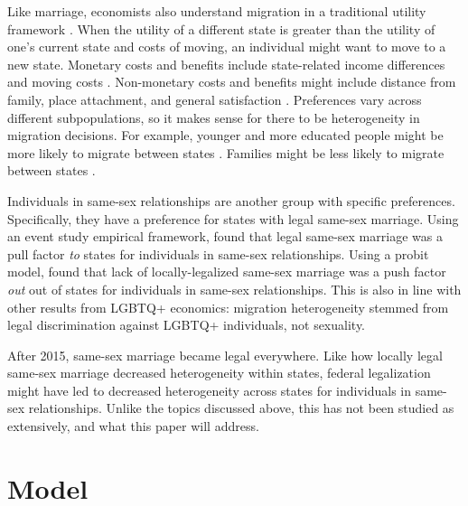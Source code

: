 \documentclass[12pt,letterpaper]{article}
\begin{document}
Like marriage, economists also understand migration in a traditional utility framework \citep{12, 8}. When the utility of a different state is greater than the utility of one’s current state and costs of moving, an individual might want to move to a new state. Monetary costs and benefits include state-related income differences and moving costs \citep{1, 15, 16, 17}. Non-monetary costs and benefits might include distance from family, place attachment, and general satisfaction \citep{1, 15}. Preferences vary across different subpopulations, so it makes sense for there to be heterogeneity in migration decisions. For example, younger and more educated people might be more likely to migrate between states \citep{17}. Families might be less likely to migrate between states \citep{16}. 


Individuals in same-sex relationships are another group with specific preferences. Specifically, they have a preference for states with legal same-sex marriage. Using an event study empirical framework, \citet{1} found that legal same-sex marriage was a pull factor \textit{to} states for individuals in same-sex relationships. Using a probit model, \citet{12} found that lack of locally-legalized same-sex marriage was a push factor \textit{out} out of states for individuals in same-sex relationships. This is also in line with other results from LGBTQ+ economics: migration heterogeneity stemmed from legal discrimination against LGBTQ+ individuals, not sexuality.


After 2015, same-sex marriage became legal everywhere. Like how locally legal same-sex marriage decreased heterogeneity within states, federal legalization might have led to decreased heterogeneity across states for individuals in same-sex relationships. Unlike the topics discussed above, this has not been studied as extensively, and what this paper will address.




\section{Model}
\end{document}
